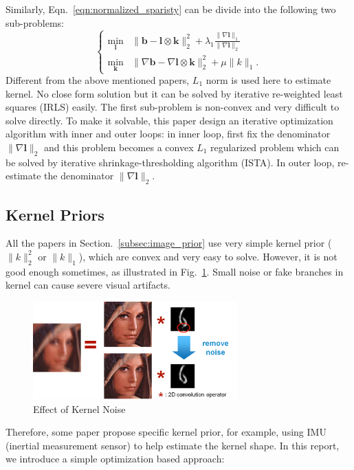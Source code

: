 \documentclass[journal, onecolumn, 10pt]{IEEEtran}
\begin{document}
Similarly, Eqn.~\ref{eqn:normalized_sparisty} can be divide into the following two sub-problems:
\begin{equation}
\begin{cases}
\min_{\mathbf{l}} &\| \mathbf{b} - \mathbf{l} \otimes \mathbf{k} \|_2^2 + \lambda_1 \frac{\|\nabla\mathbf{l}\|_1}{\|\nabla\mathbf{l}\|_2} \\
\min_{\mathbf{k}} &\| \nabla\mathbf{b} - \nabla\mathbf{l} \otimes \mathbf{k} \|_2^2 + \mu \|k\|_1.
\end{cases}
\label{eqn:normalized_sparsity_alter}
\end{equation}
Different from the above mentioned papers, $L_1$ norm is used here to estimate kernel. No close form solution but it can be solved by iterative re-weighted least squares (IRLS) easily. The first sub-problem is non-convex and very difficult to solve directly. To make it solvable, this paper design an iterative optimization algorithm with inner and outer loops: in inner loop, first fix the denominator $\|\nabla \mathbf{l}\|_2$ and this problem becomes a convex $L_1$ regularized problem which can be solved by iterative shrinkage-thresholding algorithm (ISTA)\cite{beck2009fast}. In outer loop, re-estimate the denominator $\|\nabla \mathbf{l}\|_2$.

\subsection{Kernel Priors}
\label{subsec:kernel_prior}
All the papers in Section.~\ref{subsec:image_prior} use very simple kernel prior ($\|k\|_2^2$ or $\|k\|_1$), which are convex and very easy to solve. However, it is not good enough sometimes, as illustrated in Fig.~\ref{fig:kernel_noise}. Small noise or fake branches in kernel can cause severe visual artifacts.
\begin{figure}[h!]
\centering
\includegraphics[width = 0.7\textwidth]{pic/kernel_noise.png}
\caption{Effect of Kernel Noise}
\label{fig:kernel_noise}
\end{figure}
Therefore, some paper propose specific kernel prior, for example, using IMU (inertial measurement sensor) to help estimate the kernel shape. In this report, we introduce a simple optimization based approach:
\end{document}
